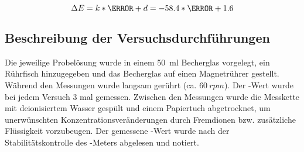 \documentclass{article}
\begin{document}
      \begin{equation}
        \Delta E = k * \pH + d = -58.4 * \pH + 1.6 
      \end{equation}
      
    \subsection{Beschreibung der Versuchsdurchführungen} \label{sec:Versuch}
    
      Die jeweilige Probelösung wurde in einem \SI[mode=text]{50}{\milli\litre} Becherglas vorgelegt, ein Rührfisch hinzugegeben und das Becherglas auf einen Magnetrührer gestellt. Während den Messungen wurde langsam gerührt (ca. $\SI[mode=text]{60}{rpm}$). Der \pH-Wert wurde bei jedem Versuch 3 mal gemessen. Zwischen den Messungen wurde die Messkette mit deionisiertem Wasser gespült und einem Papiertuch abgetrocknet, um unerwünschten Konzentrationsveränderungen durch Fremdionen bzw. zusätzliche Flüssigkeit vorzubeugen. Der gemessene \pH-Wert wurde nach der Stabilitätskontrolle des \pH-Meters abgelesen und notiert. 
      
\end{document}
